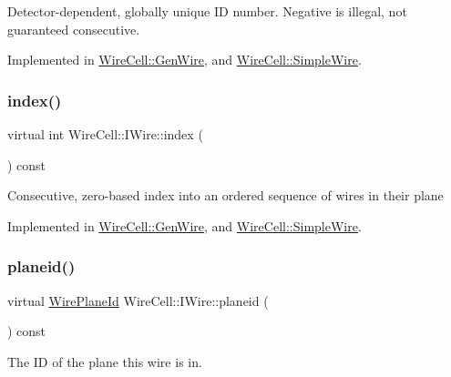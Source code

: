 Detector-\/dependent, globally unique ID number. Negative is illegal, not guaranteed consecutive. 

Implemented in \hyperlink{class_wire_cell_1_1_gen_wire_a5656bd4873e5160e01eea7fa923b3859}{Wire\+Cell\+::\+Gen\+Wire}, and \hyperlink{class_wire_cell_1_1_simple_wire_a7e7a70124200787e3b325351ab34ec8e}{Wire\+Cell\+::\+Simple\+Wire}.

\mbox{\label{class_wire_cell_1_1_i_wire_abe81fe1d38c3d0a73e812e765f2081cd}} 
\subsubsection{\texorpdfstring{index()}{index()}}
{\footnotesize\ttfamily virtual int Wire\+Cell\+::\+I\+Wire\+::index (\begin{DoxyParamCaption}{ }\end{DoxyParamCaption}) const\hspace{0.3cm}{\ttfamily [pure virtual]}}

Consecutive, zero-\/based index into an ordered sequence of wires in their plane 

Implemented in \hyperlink{class_wire_cell_1_1_gen_wire_a9d9189545db2c32b2c2e532cea2aa82e}{Wire\+Cell\+::\+Gen\+Wire}, and \hyperlink{class_wire_cell_1_1_simple_wire_a30b573d4e30069df22532b79b72d084f}{Wire\+Cell\+::\+Simple\+Wire}.

\mbox{\label{class_wire_cell_1_1_i_wire_ac1be702dac05d5298f7cf20a5fda910b}} 
\subsubsection{\texorpdfstring{planeid()}{planeid()}}
{\footnotesize\ttfamily virtual \hyperlink{class_wire_cell_1_1_wire_plane_id}{Wire\+Plane\+Id} Wire\+Cell\+::\+I\+Wire\+::planeid (\begin{DoxyParamCaption}{ }\end{DoxyParamCaption}) const\hspace{0.3cm}{\ttfamily [pure virtual]}}



The ID of the plane this wire is in. 



